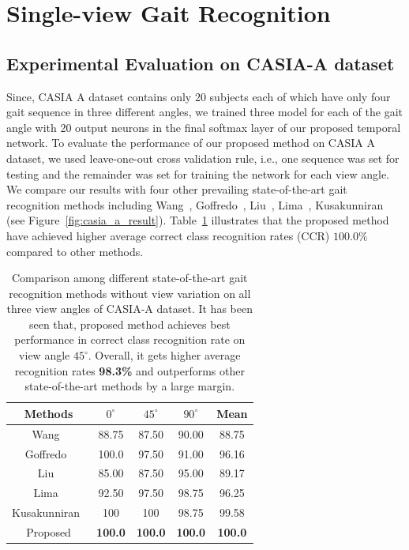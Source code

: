 \section{Single-view Gait Recognition}
\subsection{Experimental Evaluation on CASIA-A dataset}
Since, CASIA A dataset contains only 20 subjects each of which have only four gait sequence in three different angles, we trained three model for each of the gait angle with 20 output neurons in the final softmax layer of our proposed temporal network. To evaluate the performance of our proposed method on CASIA A dataset, we used leave-one-out cross validation rule, i.e., one sequence was set for testing and the remainder was set for training the network for each view angle. We compare our results with four other prevailing state-of-the-art gait recognition methods including Wang~\cite{Wang_03}, Goffredo~\cite{Goffredo_08}, Liu~\cite{Liu_16}, Lima~\cite{Lima_19}, Kusakunniran~\cite{Kusakunniran_09} (see Figure~\ref{fig:casia_a_result}). Table~\ref{table:casia_a_result} illustrates that the proposed method have achieved higher average correct class recognition rates (CCR) $100.0\%$ compared to other methods.


\begin{table}
	\centering
	\caption{Comparison among different state-of-the-art gait recognition methods without view variation on all three view angles of CASIA-A dataset. It has been seen that, proposed method achieves best performance in correct class recognition rate on view angle ${45^{\circ}}$. Overall, it gets higher average recognition rates \textbf{98.3\%} and outperforms other state-of-the-art methods by a large margin. \label{table:casia_a_result}}
	{\begin{tabular*}{30pc}{@{\extracolsep{\fill}}ccccc}\hline
			
			Methods &${0^{\circ}}$ &${45^{\circ}}$   &${90^{\circ}}$  &Mean\\
			\hline
			
			Wang~\cite{Wang_03} &88.75 &87.50 &90.00 &88.75\\
			
			\noalign{\smallskip}
			Goffredo~\cite{Goffredo_08} &100.0 &97.50 &91.00 &96.16\\ 
			
			\noalign{\smallskip}
			Liu~\cite{Liu_16} &85.00 &87.50 &95.00 &89.17\\ 
			
			\noalign{\smallskip}
			Lima~\cite{Lima_19} &92.50 &97.50 &98.75 &96.25 \\
			
			\noalign{\smallskip}
			Kusakunniran~\cite{Kusakunniran_09} &100  &100  &98.75 &99.58 \\
			
			\noalign{\smallskip}
			Proposed &{\textbf{100.0}} & {\textbf{100.0}} &{\textbf{100.0}} & {\textbf{100.0}}\\
			\hline
	\end{tabular*}}{}
\end{table}

